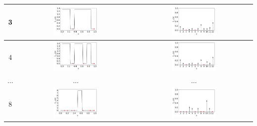 \documentclass[twoside,11pt]{book}
\numberwithin{theorem}{chapter}
\numberwithin{definition}{chapter}
\numberwithin{proposition}{chapter}
\numberwithin{corollary}{chapter}
\numberwithin{example}{chapter}
\numberwithin{lemma}{chapter}
\numberwithin{assumption}{chapter}
\numberwithin{equation}{chapter}
\numberwithin{figure}{chapter}
\begin{document}
\begin{table}[]
\begin{tabular}{| c| c| c|}
3 & \includegraphics[width= 0.4\textwidth, height = 0.16\textheight]{img/Haar/haar_Ensemble_1D_conditional_N_2.pdf} & \includegraphics[width= 0.4\textwidth, height = 0.16\textheight]{img/discrete/discrete_Ensemble_1D_conditional_N_2.pdf}\\
\hline
4 & \includegraphics[width= 0.4\textwidth, height = 0.16\textheight]{img/Haar/haar_Ensemble_1D_conditional_N_3.pdf} & \includegraphics[width= 0.4\textwidth, height = 0.16\textheight]{img/discrete/discrete_Ensemble_1D_conditional_N_3.pdf}\\
\hline
$\dots$ &$ \dots$ & $\dots$\\
\hline
8 & \includegraphics[width= 0.4\textwidth, height = 0.16\textheight]{img/Haar/haar_Ensemble_1D_conditional_N_7.pdf} & \includegraphics[width= 0.4\textwidth, height = 0.16\textheight]{img/discrete/discrete_Ensemble_1D_conditional_N_7.pdf}\\

\end{tabular}
\end{table}
\end{document}
